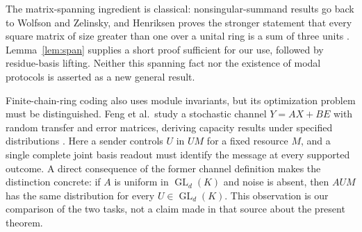 \documentclass[11pt]{article}
\theoremstyle{definition}\newtheorem{definition}[theorem]{Definition}
\theoremstyle{remark}\newtheorem{remark}[theorem]{Remark}
\DeclareMathOperator{\GL}{GL}
\begin{document}
The matrix-spanning ingredient is classical: nonsingular-summand results go back to Wolfson and Zelinsky, and Henriksen proves the stronger statement that every square matrix of size greater than one over a unital ring is a sum of three units \cite{Zelinsky1954,Henriksen1974}. Lemma~\ref{lem:span} supplies a short proof sufficient for our use, followed by residue-basis lifting. Neither this spanning fact nor the existence of modal protocols is asserted as a new general result.

Finite-chain-ring coding also uses module invariants, but its optimization problem must be distinguished. Feng et al.\ study a stochastic channel $Y=AX+BE$ with random transfer and error matrices, deriving capacity results under specified distributions \cite{Feng2014}. Here a sender controls $U$ in $UM$ for a fixed resource $M$, and a single complete joint basis readout must identify the message at every supported outcome. A direct consequence of the former channel definition makes the distinction concrete: if $A$ is uniform in $\GL_d(K)$ and noise is absent, then $AUM$ has the same distribution for every $U\in\GL_d(K)$. This observation is our comparison of the two tasks, not a claim made in that source about the present theorem.
\end{document}
